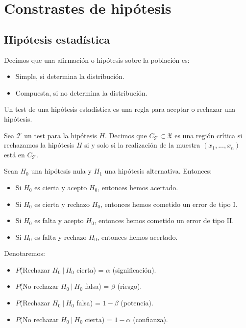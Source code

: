 \chapter{Constrastes de hipótesis}

\section{Hipótesis estadística}

\begin{defi}
    Decimos que una afirmación o hipótesis sobre la población es:
    \begin{itemize}
        \item Simple, si determina la distribución.
        \item Compuesta, si no determina la distribución.
    \end{itemize}
\end{defi}

\begin{defi}
    Un test de una hipótesis estadística es una regla para aceptar o rechazar una hipótesis.
\end{defi}

\begin{defi}
    Sea $\mathcal{T}$ un test para la hipótesis $H$. Decimos que $C_{\mathcal{T}} \subset \mathfrak{X}$ es una región crítica si rechazamos la hipótesis $H$ si y solo si la realización de la muestra $(x_1,...,x_n)$ está en $C_{\mathcal{T}}$.
\end{defi}

\begin{obs}
    Sean $H_0$ una hipótesis nula y $H_1$ una hipótesis alternativa. Entonces:
    \begin{itemize}
        \item Si $H_0$ es cierta y acepto $H_0$, entonces hemos acertado.
        \item Si $H_0$ es cierta y rechazo $H_0$, entonces hemos cometido un error de tipo I.
        \item Si $H_0$ es falta y acepto $H_0$, entonces hemos cometido un error de tipo II.
        \item Si $H_0$ es falta y rechazo $H_0$, entonces hemos acertado.
    \end{itemize}
    Denotaremos:
    \begin{itemize}
        \item $P$(Rechazar $H_0 \ | \ H_0$ cierta) = $\alpha$ (significación).
        \item $P$(No rechazar $H_0 \ | \ H_0$ falsa) = $\beta$ (riesgo).
        \item $P$(Rechazar $H_0 \ | \ H_0$ falsa) = $1 -\beta$ (potencia).
        \item $P$(No rechazar $H_0 \ | \ H_0$ cierta) = $1 -\alpha$ (confianza).
    \end{itemize}
\end{obs}

